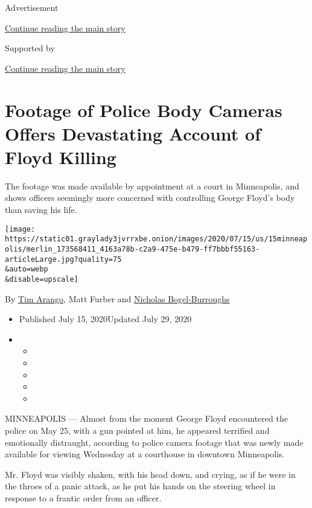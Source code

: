 Advertisement

\protect\hyperlink{after-top}{Continue reading the main story}

Supported by

\protect\hyperlink{after-sponsor}{Continue reading the main story}

\hypertarget{footage-of-police-body-cameras-offers-devastating-account-of-floyd-killing}{%
\section{Footage of Police Body Cameras Offers Devastating Account of
Floyd
Killing}\label{footage-of-police-body-cameras-offers-devastating-account-of-floyd-killing}}

The footage was made available by appointment at a court in Minneapolis,
and shows officers seemingly more concerned with controlling George
Floyd's body than saving his life.

\texttt{[image: https://static01.graylady3jvrrxbe.onion/images/2020/07/15/us/15minneapolis/merlin\_173568411\_4163a78b-c2a9-475e-b479-ff7bbbf55163-articleLarge.jpg?quality=75\\\&auto=webp\\\&disable=upscale]}

By \href{https://www.nytimes3xbfgragh.onion/by/tim-arango}{Tim Arango},
Matt Furber and
\href{https://www.nytimes3xbfgragh.onion/by/nicholas-bogel-burroughs}{Nicholas
Bogel-Burroughs}

\begin{itemize}
\item
  Published July 15, 2020Updated July 29, 2020
\item
  \begin{itemize}
  \item
  \item
  \item
  \item
  \item
  \end{itemize}
\end{itemize}

MINNEAPOLIS --- Almost from the moment George Floyd encountered the
police on May 25, with a gun pointed at him, he appeared terrified and
emotionally distraught, according to police camera footage that was
newly made available for viewing Wednesday at a courthouse in downtown
Minneapolis.

Mr. Floyd was visibly shaken, with his head down, and crying, as if he
were in the throes of a panic attack, as he put his hands on the
steering wheel in response to a frantic order from an officer.

